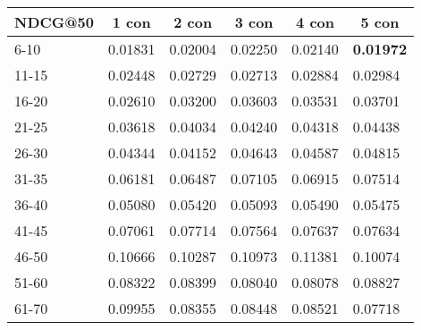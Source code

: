 \begin{table}[]
    \begin{tabular}{|l|l|l|l|l|l|}
    \hline
    NDCG@50 & \multicolumn{1}{c|}{1 con} & \multicolumn{1}{c|}{2 con} & \multicolumn{1}{c|}{3 con} & \multicolumn{1}{c|}{4 con} & \multicolumn{1}{c|}{5 con} \\ \hline
    6-10    & 0.01831                    & 0.02004                    & 0.02250                    & 0.02140                    & \textbf{0.01972}           \\ \hline
    11-15   & 0.02448                    & 0.02729                    & 0.02713                    & 0.02884                    & 0.02984                    \\ \hline
    16-20   & 0.02610                    & 0.03200                    & 0.03603                    & 0.03531                    & 0.03701                    \\ \hline
    21-25   & 0.03618                    & 0.04034                    & 0.04240                    & 0.04318                    & 0.04438                    \\ \hline
    26-30   & 0.04344                    & 0.04152                    & 0.04643                    & 0.04587                    & 0.04815                    \\ \hline
    31-35   & 0.06181                    & 0.06487                    & 0.07105                    & 0.06915                    & 0.07514                    \\ \hline
    36-40   & 0.05080                    & 0.05420                    & 0.05093                    & 0.05490                    & 0.05475                    \\ \hline
    41-45   & 0.07061                    & 0.07714                    & 0.07564                    & 0.07637                    & 0.07634                    \\ \hline
    46-50   & 0.10666                    & 0.10287                    & 0.10973                    & 0.11381                    & 0.10074                    \\ \hline
    51-60   & 0.08322                    & 0.08399                    & 0.08040                    & 0.08078                    & 0.08827                    \\ \hline
    61-70   & 0.09955                    & 0.08355                    & 0.08448                    & 0.08521                    & 0.07718                    \\ \hline

\end{tabular}
\end{table}
